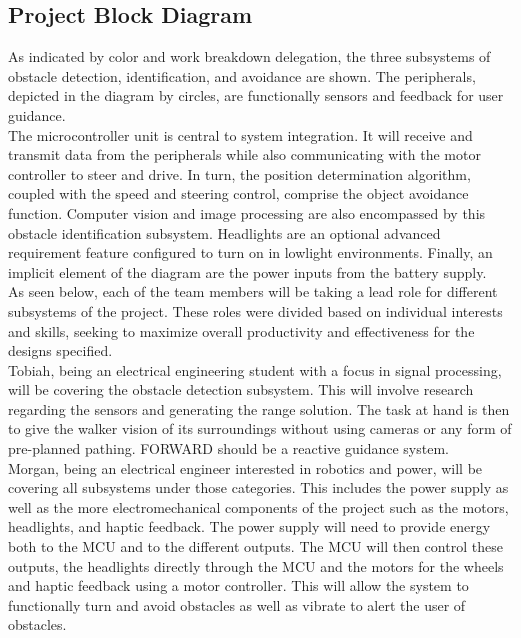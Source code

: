 \subsection{Project Block Diagram}

\noindent As indicated by color and work breakdown delegation, the three subsystems of obstacle detection, identification, and avoidance are shown. The peripherals, depicted in the diagram by circles, are functionally sensors and feedback for user guidance. \\

\noindent The microcontroller unit is central to system integration. It will receive and transmit data from the peripherals while also communicating with the motor controller to steer and drive. In turn, the position determination algorithm, coupled with the speed and steering control, comprise the object avoidance function. Computer vision and image processing are also encompassed by this obstacle identification subsystem. Headlights are an optional advanced requirement feature configured to turn on in lowlight environments. Finally, an implicit element of the diagram are the power inputs from the battery supply.\\

\noindent As seen below, each of the team members will be taking a lead role for different subsystems of the project. These roles were divided based on individual interests and skills, seeking to maximize overall productivity and effectiveness for the designs specified.\\

\noindent Tobiah, being an electrical engineering student with a focus in signal processing, will be covering the obstacle detection subsystem. This will involve research regarding the sensors and generating the range solution. The task at hand is then to give the walker vision of its surroundings without using cameras or any form of pre-planned pathing. FORWARD should be a reactive guidance system. \\

\noindent Morgan, being an electrical engineer interested in robotics and power, will be covering all subsystems under those categories. This includes the power supply as well as the more electromechanical components of the project such as the motors, headlights, and haptic feedback. The power supply will need to provide energy both to the MCU and to the different outputs. The MCU will then control these outputs, the headlights directly through the MCU and the motors for the wheels and haptic feedback using a motor controller. This will allow the system to functionally turn and avoid obstacles as well as vibrate to alert the user of obstacles. \\

